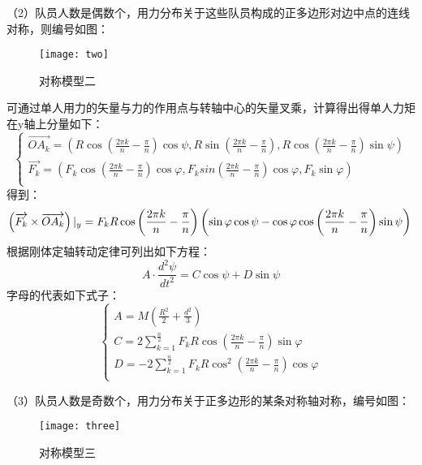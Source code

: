 \documentclass[withoutpreface,bwprint]{cumcmthesis} %
\begin{document}
（2）队员人数是偶数个，用力分布关于这些队员构成的正多边形对边中点的连线对称，则编号如图：
\begin{figure}[!hbtp]
    \centering
    \texttt{[image: two]}
    \caption{对称模型二}
    \label{fig:two}
\end{figure}\par

可通过单人用力的矢量与力的作用点与转轴中心的矢量叉乘，计算得出得单人力矩在y轴上分量如下：
\begin{equation}
\begin{cases}
    \overrightarrow{OA_k}=\left ( R\cos\left( \frac{2\pi k}{n}-\frac{\pi}{n}\right )\cos \psi ,R\sin\left( \frac{2\pi k}{n}-\frac{\pi}{n}\right ),R\cos\left( \frac{2\pi k}{n}-\frac{\pi}{n}\right )\sin \psi \right ) \\
    \overrightarrow{F_k}=\left ( F_k\cos\left( \frac{2\pi k}{n}-\frac{\pi}{n}\right )\cos\varphi ,F_ksin\left( \frac{2\pi k}{n}-\frac{\pi}{n}\right )\cos\varphi ,F_k\sin\varphi  \right ) \\

\end{cases}
\end{equation}
得到：
\begin{equation}
\left ( \overrightarrow{F_k} \times \overrightarrow{OA_k}\right )|_y=F_kR\cos\left( \frac{2\pi k}{n}-\frac{\pi}{n}\right )\left ( \sin\varphi\cos\psi-\cos\varphi\cos\left( \frac{2\pi k}{n}-\frac{\pi}{n}\right )\sin\psi \right )\\
\end{equation}
根据刚体定轴转动定律可列出如下方程：
\begin{equation}
A\cdot \frac{d^{2}\psi }{dt^{2} }=C\cos\psi+D\sin \psi
\end{equation}
字母的代表如下式子：
\begin{equation}
\begin{cases}
A=M\left ( \frac{R^2}{2}+\frac{d^2}{3} \right ) \\
C=2\sum_{k=1}^{\frac{n}{2}}F_kR\cos\left( \frac{2\pi k}{n}-\frac{\pi}{n}\right )\sin\varphi \\
D=-2\sum_{k=1}^{\frac{n}{2}}F_kR\cos^2\left( \frac{2\pi k}{n}-\frac{\pi}{n}\right )\cos\varphi
\\
\end{cases}
\end{equation}


（3）队员人数是奇数个，用力分布关于正多边形的某条对称轴对称，编号如图：
\begin{figure}[!hbtp]
    \centering
    \texttt{[image: three]}
    \caption{对称模型三}
    \label{fig:three}
\end{figure}\par
\end{document}
